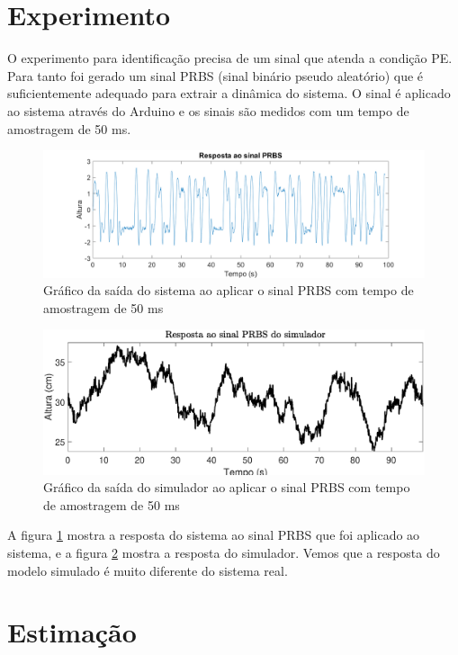 \section{Experimento}\label{s:4experimento}
O experimento para identificação precisa de um sinal que atenda a condição PE. Para tanto foi gerado um sinal PRBS (sinal binário pseudo aleatório) que é suficientemente adequado para extrair a dinâmica do sistema. O sinal é aplicado ao sistema através do Arduino e os sinais são medidos com um tempo de amostragem de 50 ms.
\begin{figure}[H]
	\centering
	\includegraphics[width=1\linewidth]{sinalprbsid}
	\caption[Gráfico da saída PRBS do sistema]{Gráfico da saída do sistema ao aplicar o sinal PRBS com tempo de amostragem de 50 ms}
	\label{fig:sinalprbsid}
\end{figure}

\begin{figure}[H]
	\centering
	\includegraphics[width=1\linewidth]{sinalprbsidsimul}
	\caption[Gráfico da saída PRBS do simulador]{Gráfico da saída do simulador ao aplicar o sinal PRBS com tempo de amostragem de 50 ms}
	\label{fig:sinalprbsidsimul}
\end{figure}


A figura \ref{fig:sinalprbsid} mostra a resposta do sistema ao sinal PRBS que foi aplicado ao sistema, e a figura \ref{fig:sinalprbsidsimul} mostra a resposta do simulador. Vemos que a resposta do modelo simulado é muito diferente do sistema real.

\section{Estimação}\label{s:4estimacao}

